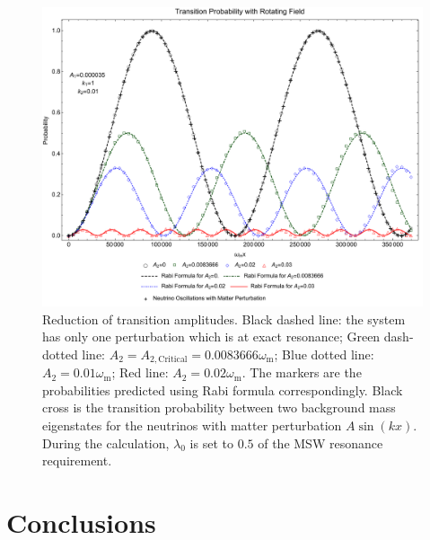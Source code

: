 \documentclass[%
preprint,
 amsmath,amssymb,
 aps,
]{revtex4-1}
\begin{document}
\begin{figure}[!htbp]
                \centering
                \includegraphics[width=\textwidth]{assets/rabi-oscillations-energy-gap-change-k2-0-01}
                \caption{Reduction of transition amplitudes. Black dashed line: the system has only one perturbation which is at exact resonance; Green dash-dotted line: $A_2=A_{2,\mathrm{Critical}}=0.0083666\omega_{\mathrm m}$; Blue dotted line: $A_2=0.01\omega_{\mathrm m}$; Red line: $A_2=0.02\omega_{\mathrm m}$. The markers are the probabilities predicted using Rabi formula correspondingly. Black cross is the transition probability between two background mass eigenstates for the neutrinos with matter perturbation $A\sin(kx)$. During the calculation, $\lambda_0$ is set to $0.5$ of the MSW resonance requirement.}
                \label{fig-rabi-oscillations-energy-gap-change}
\end{figure}



\section{\label{conclusions}Conclusions}









 



\end{document}

